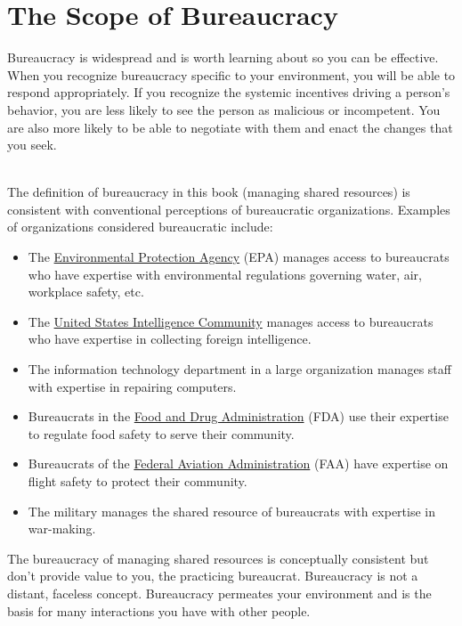 \section{The Scope of Bureaucracy}
Bureaucracy is widespread and is worth learning about so you can be effective.  When you recognize bureaucracy specific to your environment, you will be able to respond appropriately. If you recognize the systemic incentives driving a person's behavior, you are less likely to see the person as malicious or incompetent. You are also more likely to be able to negotiate with them and enact the changes that you seek.

\ \\

The definition of bureaucracy in this book (managing \glspl{shared resource}) is consistent with conventional perceptions of bureaucratic organizations. 
Examples of organizations considered bureaucratic include:
  \begin{itemize}
      \item The \href{https://www.epa.gov/}{Environmental Protection Agency} (EPA) manages access to bureaucrats who have expertise with environmental regulations governing water, air, workplace safety, etc.
      \item The \href{https://www.intelligence.gov/}{United States Intelligence Community} manages access to bureaucrats who have expertise in collecting foreign intelligence.
      \item The information technology department in a large organization manages staff with expertise in repairing computers.
      \item Bureaucrats in the \href{https://www.fda.gov/}{Food and Drug Administration} (FDA) use their expertise to regulate food safety to serve their community.
      \item Bureaucrats of the \href{https://www.faa.gov/}{Federal Aviation Administration} (FAA) have expertise on flight safety to protect their community.
      \item The military manages the shared resource of bureaucrats with expertise in war-making.
  \end{itemize}

The bureaucracy of managing shared resources is conceptually consistent but don't provide value to you, the practicing bureaucrat. Bureaucracy is not a distant, faceless concept. Bureaucracy permeates your environment and is the basis for many interactions you have with other people. 

